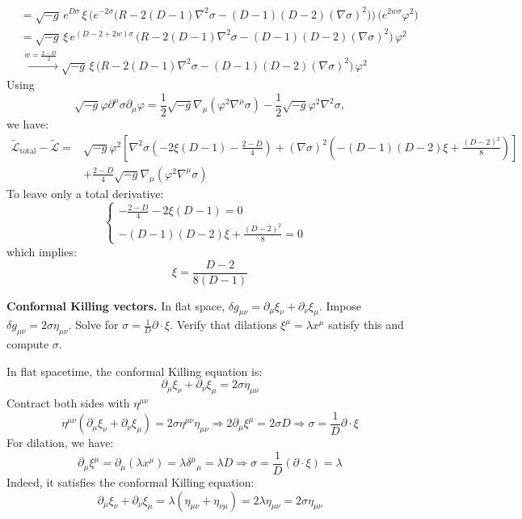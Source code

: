 \begin{solution}[27.3]
$$\begin{aligned}
	&=\sqrt{-g}\,e^{D\sigma}\,\xi\,
	\Big(e^{-2\sigma}\big(R-2(D-1)\nabla^{2}\sigma-(D-1)(D-2)(\nabla\sigma)^{2}\big)\Big)\,
	\big(e^{2w\sigma}\varphi^{2}\big)\\
	&=\sqrt{-g}\,\xi\,e^{(D-2+2w)\sigma}\,
	\big(R-2(D-1)\nabla^{2}\sigma-(D-1)(D-2)(\nabla\sigma)^{2}\big)\,
	\varphi^{2}\\
	&\xrightarrow{\,w=\frac{2-D}{2}\,}\sqrt{-g}\,\xi\,
	\big(R-2(D-1)\nabla^{2}\sigma-(D-1)(D-2)(\nabla\sigma)^{2}\big)\,
	\varphi^{2}
\end{aligned}
$$
Using
\[
\sqrt{-g}\varphi\partial^\mu \sigma\partial_\mu\varphi=\frac12\sqrt{-g}\nabla_\mu \left(\varphi^2\nabla^\mu\sigma\right)-\frac12\sqrt{-g}\varphi^2\nabla^2\sigma,
\]
we have:
\[
\begin{aligned}
	\tilde{\mathcal{L}}_\text{total}-\tilde{\mathcal{L}}=&\sqrt{-g}\varphi^2\left[
	\nabla^2\sigma\left(-2\xi(D-1)-\frac{2-D}{4}\right)
	+(\nabla\sigma)^2\left(-(D-1)(D-2)\xi+\frac{(D-2)^2}{8}\right)\right]
	\\&+\frac{2-D}{4}\sqrt{-g}\nabla_\mu\left(\varphi^2\nabla^\mu\sigma\right)
\end{aligned}
\]
To leave only a total derivative:
\[
\begin{cases}
	-\frac{2-D}{4}-2\xi(D-1)=0&\\
	-(D-1)(D-2)\xi+\frac{(D-2)^2}{8}=0&
\end{cases}
\]
which implies:
\[
\boxed{
\xi=\frac{D-2}{8(D-1)}
}
\]
\end{solution}
\begin{problem}
    \textbf{Conformal Killing vectors.} In flat space, \(\delta g_{\mu\nu}=\partial_\mu\xi_\nu+\partial_\nu\xi_\mu\). Impose \(\delta g_{\mu\nu}=2\sigma\eta_{\mu\nu}\). Solve for \(\sigma=\frac{1}{D}\partial\cdot\xi\). Verify that dilations \(\xi^\mu=\lambda x^\mu\) satisfy this and compute \(\sigma\).
\end{problem}
\begin{solution}[27.4]
	In flat spacetime, the conformal Killing equation is:
	\[
	\partial_\mu\xi_\nu+\partial_\nu\xi_\mu=2\sigma\eta_{\mu\nu}
	\]
	Contract both sides with $\eta^{\mu\nu}$
	\[
	\eta^{\mu\nu}(\partial_\mu\xi_\nu+\partial_\nu\xi_\mu)=2\sigma\eta^{\mu\nu}\eta_{\mu\nu}\Rightarrow2\partial_\mu\xi^\mu=2\sigma D\Rightarrow\boxed{\sigma=\frac{1}{D}\partial\cdot\xi}
	\]
	For dilation, we have:
	\[
	\partial_\mu\xi^\mu=\partial_\mu(\lambda x^\mu)=\lambda\delta^\mu{}_\mu=\lambda D\Rightarrow\boxed{\sigma=\frac{1}{D}(\partial\cdot\xi)=\lambda}
	\]
	Indeed, it satisfies the conformal Killing equation:
	\[
	\partial_\mu\xi_\nu+\partial_\nu\xi_\mu=\lambda(\eta_{\mu\nu}+\eta_{\nu\mu})=2\lambda\eta_{\mu\nu}=2\sigma\eta_{\mu\nu}
	\]
\end{solution}
